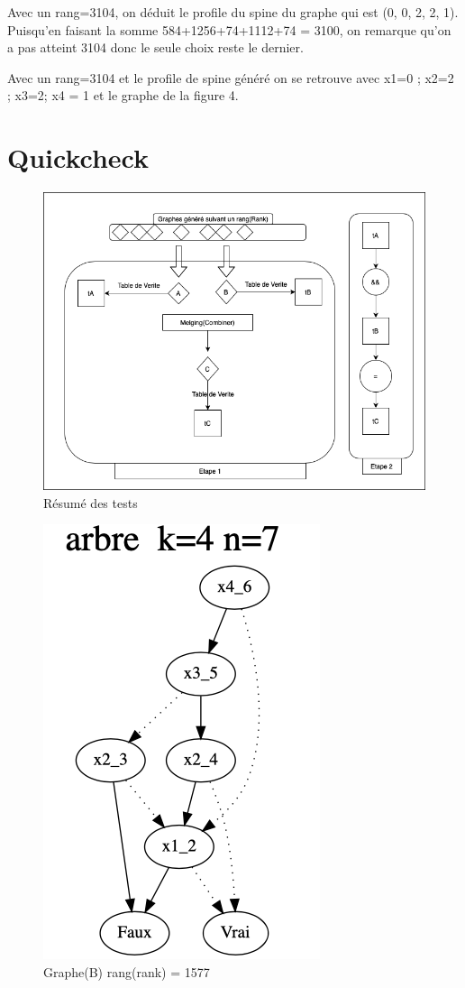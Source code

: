 \documentclass[french]{article}
\begin{document}
Avec un rang=3104, on déduit le profile du spine du graphe qui est (0, 0, 2, 2, 1). Puisqu'en faisant la somme 584+1256+74+1112+74 = 3100, on remarque qu'on a pas atteint 3104 donc le seule choix reste le dernier.

Avec un rang=3104 et le profile de spine généré on se retrouve avec {x1=0 ; x2=2  ; x3=2; x4 = 1} et le graphe de la figure 4.

\section{Quickcheck}

\begin{figure}[h!]
    \centering
    \includegraphics[scale=0.3]{generator.png}
    \caption{Résumé des tests}
    \label{fig:Concept}
\end{figure}

\begin{figure}[h!]
    \centering
    \includegraphics[scale=0.4]{arb_1577.png}
    \caption{Graphe(B) rang(rank) = 1577}
    \label{fig:graphe_B}
\end{figure}
\end{document}
